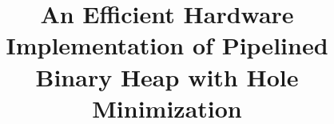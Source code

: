 \title{An Efficient Hardware Implementation of Pipelined Binary Heap with Hole Minimization}

\ifdefined\DRAFT
 \pagestyle{fancyplain}
 \rhead{\thedate}
\fi

\author{}
